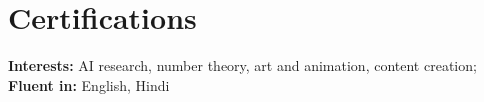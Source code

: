\documentclass[10pt]{article}
\newcommand{\cert}[5]{%
  \iftoggle{cert#1}{%
    \item \textbf{#2} \textit{(#3)}\ifblank{#4}{}{, #4}%
    \ifblank{#5}{}{\hfill\href{#5}{[Verify]}}%
  }{}%
}
\begin{document}
\section*{Certifications}
\begin{itemize}[itemsep=0.5pt]
  \cert{aws}{AWS Certified Cloud Practitioner}{Amazon Web Services}{}{https://github.com/primetree2/cisco-certificate/blob/main/AWS\%20Certified\%20Cloud\%20Practitioner\%20certificate.pdf}
  \cert{oci}{Oracle OCI Generative AI Professional}{Oracle}{}{https://github.com/primetree2/cisco-certificate/blob/main/eCertificate.pdf}
  \cert{sap}{SAP Generative AI Developer}{SAP}{}{https://github.com/primetree2/cisco-certificate/blob/main/SAP_LA_AIG02_EN_11_EX.pdf}
  \cert{mern}{MERN Full Stack}{Ethnus}{}{https://github.com/primetree2/cisco-certificate/blob/main/3G3GLRGN.pdf}
\end{itemize}

\vspace{2pt}
\textbf{Interests:} AI research, number theory, art and animation, content creation; \textbf{Fluent in:} English, Hindi
\end{document}
